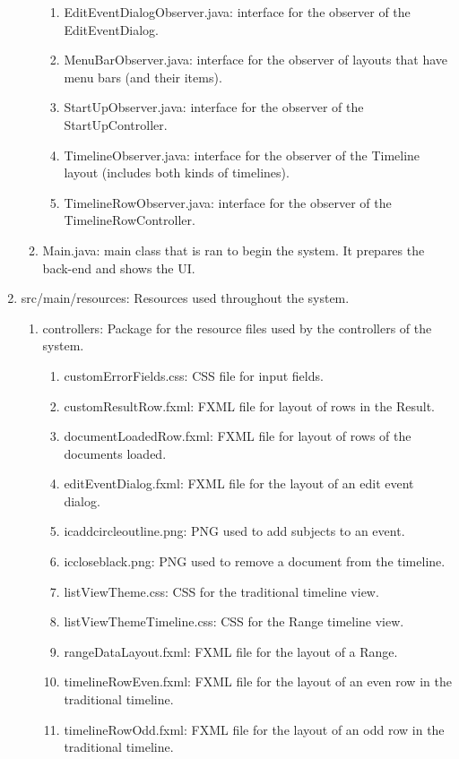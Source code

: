 \begin{enumerate}
\begin{enumerate}
\begin{enumerate}
			\item EditEventDialogObserver.java: interface for the observer of the EditEventDialog.
			\item MenuBarObserver.java: interface for the observer of layouts that have menu bars (and their items).
			\item StartUpObserver.java: interface for the observer of the StartUpController.
			\item TimelineObserver.java: interface for the observer of the Timeline layout (includes both kinds of timelines).
			\item TimelineRowObserver.java: interface for the observer of the TimelineRowController.
		\end{enumerate}
		\item Main.java: main class that is ran to begin the system. It prepares the back-end and shows the UI.
	\end{enumerate}
	\item src/main/resources: Resources used throughout the system.
	\begin{enumerate}
		\item controllers: Package for the resource files used by the controllers of the system.
		\begin{enumerate}
			\item customErrorFields.css: CSS file for input fields.
			\item customResultRow.fxml: FXML file for layout of rows in the Result.
			\item documentLoadedRow.fxml: FXML file for layout of rows of the documents loaded.
			\item editEventDialog.fxml: FXML file for the layout of an edit event dialog.
			\item icaddcircleoutline.png: PNG used to add subjects to an event.
			\item iccloseblack.png: PNG used to remove a document from the timeline.
			\item listViewTheme.css: CSS for the traditional timeline view.
			\item listViewThemeTimeline.css: CSS for the Range timeline view.
			\item rangeDataLayout.fxml: FXML file for the layout of a Range.
			\item timelineRowEven.fxml: FXML file for the layout of an even row in the traditional timeline.
			\item timelineRowOdd.fxml: FXML file for the layout of an odd row in the traditional timeline.
		\end{enumerate}

\end{enumerate}
\end{enumerate}
